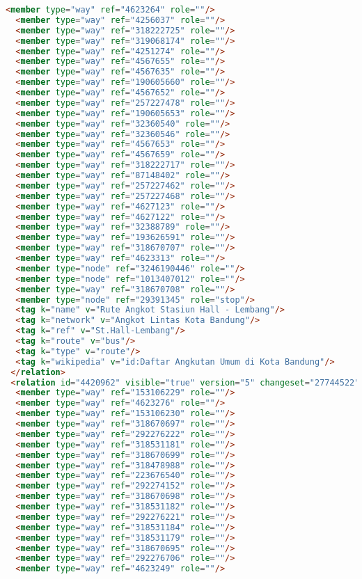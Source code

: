 \begin{lstlisting}[language=HTML,basicstyle=\tiny,caption=bandung1.xml]
  <member type="way" ref="4623264" role=""/>
  <member type="way" ref="4256037" role=""/>
  <member type="way" ref="318222725" role=""/>
  <member type="way" ref="319068174" role=""/>
  <member type="way" ref="4251274" role=""/>
  <member type="way" ref="4567655" role=""/>
  <member type="way" ref="4567635" role=""/>
  <member type="way" ref="190605660" role=""/>
  <member type="way" ref="4567652" role=""/>
  <member type="way" ref="257227478" role=""/>
  <member type="way" ref="190605653" role=""/>
  <member type="way" ref="32360540" role=""/>
  <member type="way" ref="32360546" role=""/>
  <member type="way" ref="4567653" role=""/>
  <member type="way" ref="4567659" role=""/>
  <member type="way" ref="318222717" role=""/>
  <member type="way" ref="87148402" role=""/>
  <member type="way" ref="257227462" role=""/>
  <member type="way" ref="257227468" role=""/>
  <member type="way" ref="4627123" role=""/>
  <member type="way" ref="4627122" role=""/>
  <member type="way" ref="32388789" role=""/>
  <member type="way" ref="193626591" role=""/>
  <member type="way" ref="318670707" role=""/>
  <member type="way" ref="4623313" role=""/>
  <member type="node" ref="3246190446" role=""/>
  <member type="node" ref="1013407012" role=""/>
  <member type="way" ref="318670708" role=""/>
  <member type="node" ref="29391345" role="stop"/>
  <tag k="name" v="Rute Angkot Stasiun Hall - Lembang"/>
  <tag k="network" v="Angkot Lintas Kota Bandung"/>
  <tag k="ref" v="St.Hall-Lembang"/>
  <tag k="route" v="bus"/>
  <tag k="type" v="route"/>
  <tag k="wikipedia" v="id:Daftar Angkutan Umum di Kota Bandung"/>
 </relation>
 <relation id="4420962" visible="true" version="5" changeset="27744522" timestamp="2014-12-28T01:11:33Z" user="gnocin" uid="2526082">
  <member type="way" ref="153106229" role=""/>
  <member type="way" ref="4623276" role=""/>
  <member type="way" ref="153106230" role=""/>
  <member type="way" ref="318670697" role=""/>
  <member type="way" ref="292276222" role=""/>
  <member type="way" ref="318531181" role=""/>
  <member type="way" ref="318670699" role=""/>
  <member type="way" ref="318478988" role=""/>
  <member type="way" ref="223676540" role=""/>
  <member type="way" ref="292274152" role=""/>
  <member type="way" ref="318670698" role=""/>
  <member type="way" ref="318531182" role=""/>
  <member type="way" ref="292276221" role=""/>
  <member type="way" ref="318531184" role=""/>
  <member type="way" ref="318531179" role=""/>
  <member type="way" ref="318670695" role=""/>
  <member type="way" ref="292276706" role=""/>
  <member type="way" ref="4623249" role=""/>

\end{lstlisting}
